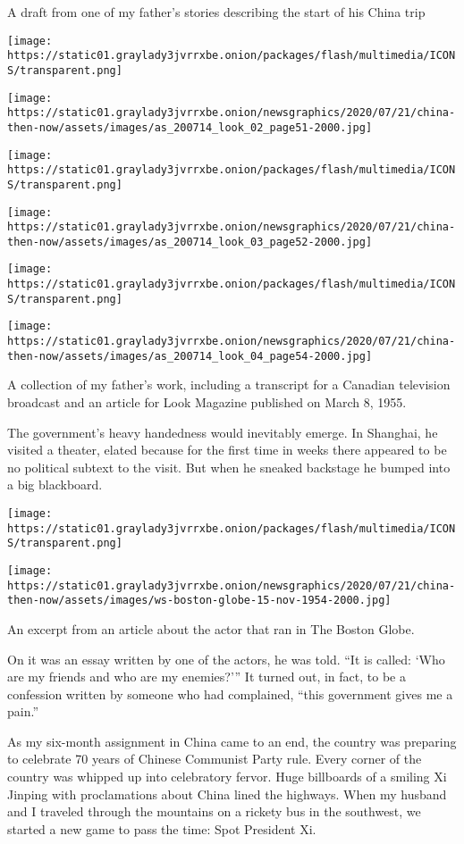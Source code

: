 A draft from one of my father's stories describing the start of his
China trip

\texttt{[image: https://static01.graylady3jvrrxbe.onion/packages/flash/multimedia/ICONS/transparent.png]}

\texttt{[image: https://static01.graylady3jvrrxbe.onion/newsgraphics/2020/07/21/china-then-now/assets/images/as\_200714\_look\_02\_page51-2000.jpg]}

\texttt{[image: https://static01.graylady3jvrrxbe.onion/packages/flash/multimedia/ICONS/transparent.png]}

\texttt{[image: https://static01.graylady3jvrrxbe.onion/newsgraphics/2020/07/21/china-then-now/assets/images/as\_200714\_look\_03\_page52-2000.jpg]}

\texttt{[image: https://static01.graylady3jvrrxbe.onion/packages/flash/multimedia/ICONS/transparent.png]}

\texttt{[image: https://static01.graylady3jvrrxbe.onion/newsgraphics/2020/07/21/china-then-now/assets/images/as\_200714\_look\_04\_page54-2000.jpg]}

A collection of my father's work, including a transcript for a Canadian
television broadcast and an article for Look Magazine published on March
8, 1955.

The government's heavy handedness would inevitably emerge. In Shanghai,
he visited a theater, elated because for the first time in weeks there
appeared to be no political subtext to the visit. But when he sneaked
backstage he bumped into a big blackboard.

\texttt{[image: https://static01.graylady3jvrrxbe.onion/packages/flash/multimedia/ICONS/transparent.png]}

\texttt{[image: https://static01.graylady3jvrrxbe.onion/newsgraphics/2020/07/21/china-then-now/assets/images/ws-boston-globe-15-nov-1954-2000.jpg]}

An excerpt from an article about the actor that ran in The Boston Globe.

On it was an essay written by one of the actors, he was told. ``It is
called: `Who are my friends and who are my enemies?''' It turned out, in
fact, to be a confession written by someone who had complained, ``this
government gives me a pain.''

As my six-month assignment in China came to an end, the country was
preparing to celebrate 70 years of Chinese Communist Party rule. Every
corner of the country was whipped up into celebratory fervor. Huge
billboards of a smiling Xi Jinping with proclamations about China lined
the highways. When my husband and I traveled through the mountains on a
rickety bus in the southwest, we started a new game to pass the time:
Spot President Xi.

